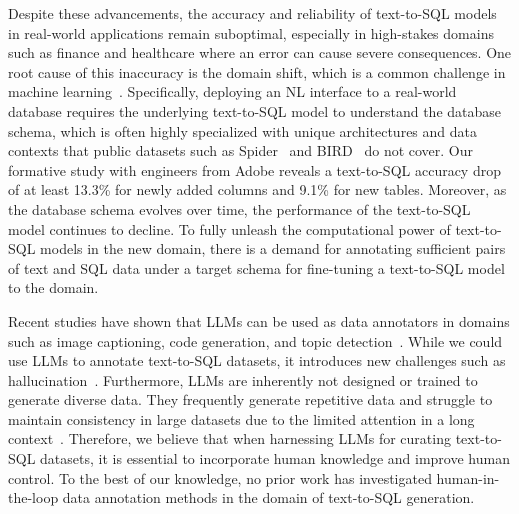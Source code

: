 Despite these advancements, the accuracy and reliability of text-to-SQL models in real-world applications remain suboptimal, especially in high-stakes domains such as finance and healthcare where an error can cause severe consequences. 
One root cause of this inaccuracy is the domain shift, which is a common challenge in machine learning~\cite{domain_adaption1, domain_adaption2, domain_adaption3}. 
Specifically, deploying an NL interface to a real-world database requires the underlying text-to-SQL model to understand the database schema, which is often highly specialized with unique architectures and data contexts that public datasets such as Spider~\cite{spider} and BIRD~\cite{bird} do not cover. %
Our formative study with engineers from Adobe reveals a text-to-SQL accuracy drop of at least 13.3\% for newly added columns and 9.1\% for new tables. Moreover, as the database schema evolves over time, the performance of the text-to-SQL model continues to decline. To fully unleash the computational power of text-to-SQL models in the new domain, there is a demand for annotating sufficient pairs of text and SQL data under a target schema for fine-tuning a text-to-SQL model to the domain. %


Recent studies have shown that  LLMs can be used as data annotators in domains such as image captioning, code generation, and topic detection~\cite{llm_data_annotation, annollm, llm_annotator_1, chatgpt_outperform_crowd_workers, self_instruct, oss_instruct, evol_instruct}.
While we could use LLMs to annotate text-to-SQL datasets, it introduces new challenges such as hallucination~\cite{llm_hallucination}. %
Furthermore, LLMs are inherently not designed or trained to generate diverse data.
They frequently generate repetitive data and struggle to maintain consistency in large datasets due to the limited attention in a long context~\cite{SPA, longformer}. Therefore, we believe that when harnessing LLMs for curating text-to-SQL datasets, it is essential to incorporate human knowledge and improve human control. To the best of our knowledge, no prior work has investigated human-in-the-loop data annotation methods in the domain of text-to-SQL generation.


